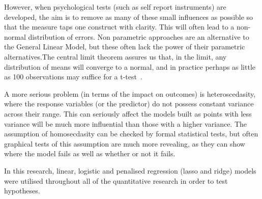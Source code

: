 However, when psychological tests (such as self report instruments) are developed, the aim is to remove as many of these small influences as possible so that the measure taps one construct with clarity. This will often lead to a non-normal distribution of errors. Non parametric approaches are an alternative to the General Linear Model, but these often lack the power of their parametric alternatives.The central limit theorem assures us that, in the limit, any distribution of means will converge to a normal, and in practice perhaps as little as 100 observations may suffice for a t-test~\cite{venables2002modern}. 

A more serious problem (in terms of the impact on outcomes) is heteroscedasity, where the response variables (or the predictor) do not possess constant variance across their range\cite{gelman2007data}. This can seriously affect the models built as points with less variance will be much more influential than those with a higher variance. The assumption of homosecdasity can be checked by formal statistical tests, but often graphical tests of this assumption are much more revealing, as they can show where the model fails as well as whether or not it fails.

In this research, linear, logistic and  penalised regression (lasso and ridge)  \cite{friedman2009elements} models were utilised throughout all of the quantitative research in order to test hypotheses. 





